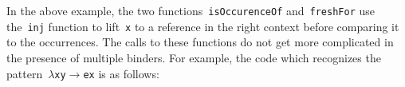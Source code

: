 \documentclass[9pt,authoryear]{sigplanconf}
\begin{document}
%
In the above example, the two functions{~}\texttt{isOccurenceOf}    and{~}\texttt{freshFor} use the{~}\texttt{inj} function to lift{~}\texttt{x} to
    a reference in the right context before comparing it to the
    occurrences. The calls to these functions do not get more
    complicated in the presence of multiple binders. For example, the
    code which recognizes the pattern{~}\texttt{$ \lambda $}\texttt{\mbox{\hspace{0.50em}}}\texttt{x}\texttt{\mbox{\hspace{0.50em}}}\texttt{y}\texttt{\mbox{\hspace{0.50em}}}\texttt{$ \rightarrow $}\texttt{\mbox{\hspace{0.50em}}}\texttt{e}\texttt{\mbox{\hspace{0.50em}}}\texttt{x} is as follows{:}%


{\nopagebreak }
\end{document}
